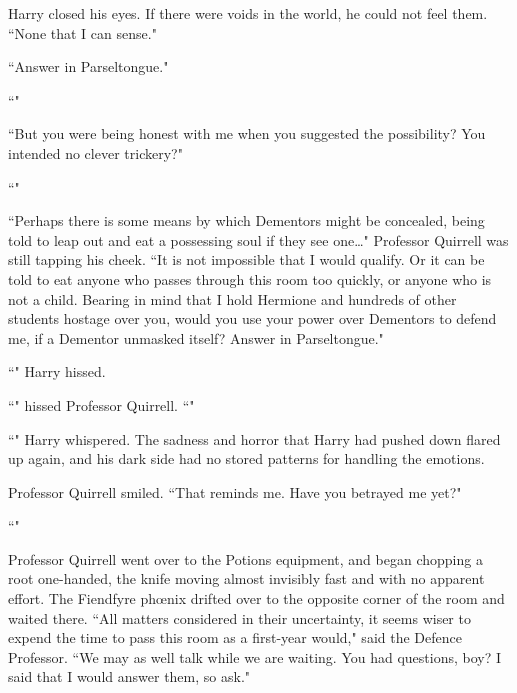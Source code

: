 Harry closed his eyes. If there were voids in the world, he could not feel them. ``None that I can sense."

``Answer in Parseltongue."

``"

``But you were being honest with me when you suggested the possibility? You intended no clever trickery?"

``"

``Perhaps there is some means by which Dementors might be concealed, being told to leap out and eat a possessing soul if they see one…" Professor Quirrell was still tapping his cheek. ``It is not impossible that I would qualify. Or it can be told to eat anyone who passes through this room too quickly, or anyone who is not a child. Bearing in mind that I hold Hermione and hundreds of other students hostage over you, would you use your power over Dementors to defend me, if a Dementor unmasked itself? Answer in Parseltongue."

``" Harry hissed.

``" hissed Professor Quirrell. ``"

``" Harry whispered. The sadness and horror that Harry had pushed down flared up again, and his dark side had no stored patterns for handling the emotions. 

Professor Quirrell smiled. ``That reminds me. Have you betrayed me yet?"

``"

Professor Quirrell went over to the Potions equipment, and began chopping a root one-handed, the knife moving almost invisibly fast and with no apparent effort. The Fiendfyre phœnix drifted over to the opposite corner of the room and waited there. ``All matters considered in their uncertainty, it seems wiser to expend the time to pass this room as a first-year would," said the Defence Professor. ``We may as well talk while we are waiting. You had questions, boy? I said that I would answer them, so ask."

